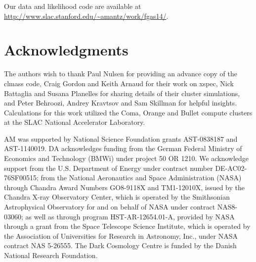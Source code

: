 \documentclass[useAMS,usenatbib,usegraphicx]{mn2e}
\begin{document}
Our data and likelihood code are available at\\ \url{http://www.slac.stanford.edu/~amantz/work/fgas14/}.






\section*{Acknowledgments}

The authors wish to thank Paul Nulsen for providing an advance copy of the {\sc clmass} code, Craig Gordon and Keith Arnaud for their work on {\sc xspec}, Nick Battaglia and Susana Planelles for sharing details of their cluster simulations, and Peter Behroozi, Andrey Kravtsov and Sam Skillman for helpful insights. Calculations for this work utilized the Coma, Orange and Bullet compute clusters at the SLAC National Accelerator Laboratory.

AM was supported by National Science Foundation grants AST-0838187 and AST-1140019. DA acknowledges funding from the German Federal Ministry of Economics and Technology (BMWi) under project 50 OR 1210. We acknowledge support from the U.S. Department of Energy under contract number DE-AC02-76SF00515; from the National Aeronautics and Space Administration (NASA) through Chandra Award Numbers GO8-9118X and TM1-12010X, issued by the Chandra X-ray Observatory Center, which is operated by the Smithsonian Astrophysical Observatory for and on behalf of NASA under contract NAS8-03060; as well as through program HST-AR-12654.01-A, provided by NASA through a grant from the Space Telescope Science Institute, which is operated by the Association of Universities for Research in Astronomy, Inc., under NASA contract NAS 5-26555. The Dark Cosmology Centre is funded by the Danish National Research Foundation.



\def \aap {A\&A} 
\def \aapr {A\&AR} 
\def \aaps {A\&AS} 
\def \statisci {Statis. Sci.} 
\def \physrep {Phys. Rep.} 
\def \pre {Phys.\ Rev.\ E} 
\def \sjos {Scand. J. Statis.} 
\def \jrssb {J. Roy. Statist. Soc. B} 
\def \pan {Phys. Atom. Nucl.} 
\def \epja {Eur. Phys. J. A} 
\def \epjc {Eur. Phys. J. C} 
\def \jcap {J. Cosmology Astropart. Phys.} 
\def \ijmpd {Int.\ J.\ Mod.\ Phys.\ D} 
\def \nar {New Astron. Rev.} 
\end{document}
